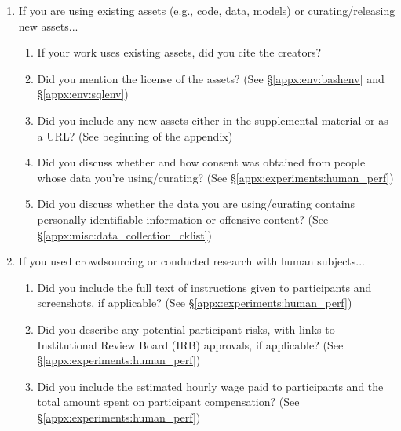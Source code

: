 \begin{enumerate}
\item If you are using existing assets (e.g., code, data, models) or curating/releasing new assets...
\begin{enumerate}
  \item If your work uses existing assets, did you cite the creators?
    \answerYes{}
  \item Did you mention the license of the assets?
    \answerYes{} (See \S\ref{appx:env:bashenv} and \S\ref{appx:env:sqlenv})
  \item Did you include any new assets either in the supplemental material or as a URL?
    \answerYes{} (See beginning of the appendix)
  \item Did you discuss whether and how consent was obtained from people whose data you're using/curating?
    \answerYes{} (See \S\ref{appx:experiments:human_perf})
  \item Did you discuss whether the data you are using/curating contains personally identifiable information or offensive content?
    \answerYes{} (See \S\ref{appx:misc:data_collection_cklist})
\end{enumerate}

\item If you used crowdsourcing or conducted research with human subjects...
\begin{enumerate}
  \item Did you include the full text of instructions given to participants and screenshots, if applicable?
    \answerYes{} (See \S\ref{appx:experiments:human_perf})
  \item Did you describe any potential participant risks, with links to Institutional Review Board (IRB) approvals, if applicable?
    \answerYes{} (See \S\ref{appx:experiments:human_perf})
  \item Did you include the estimated hourly wage paid to participants and the total amount spent on participant compensation?
    \answerYes{} (See \S\ref{appx:experiments:human_perf})
\end{enumerate}

\end{enumerate}